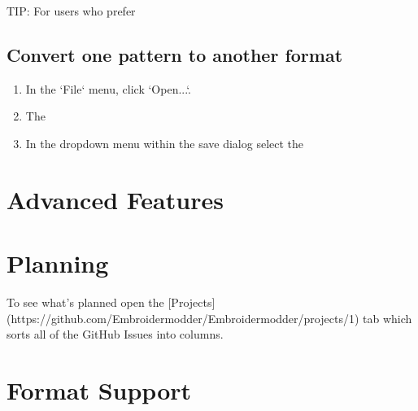\documentclass{report}
\begin{document}
TIP: For users who prefer

\subsection{Convert one pattern to another format}

\begin{enumerate}
\item In the `File` menu, click `Open...`.
\item The 
\item In the dropdown menu within the save dialog select the 
\end{enumerate}

\section{Advanced Features}


\section{Planning}

To see what's planned open the [Projects](https://github.com/Embroidermodder/Embroidermodder/projects/1) tab which sorts all of the GitHub Issues into columns.

\section{Format Support}
\end{document}
